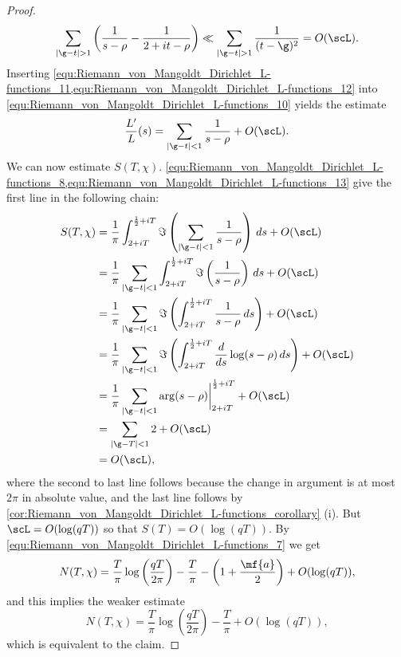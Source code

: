 \begin{proof}
\begin{equation}
          \sum_{|\g-t| > 1}\left(\frac{1}{s-\rho}-\frac{1}{2+it-\rho}\right) \ll \sum_{|\g-t| > 1}\frac{1}{(t-\g)^{2}} = O(\scL).
        \end{equation}
        Inserting \cref{equ:Riemann_von_Mangoldt_Dirichlet_L-functions_11,equ:Riemann_von_Mangoldt_Dirichlet_L-functions_12} into \cref{equ:Riemann_von_Mangoldt_Dirichlet_L-functions_10} yields the estimate
        \begin{equation}\label{equ:Riemann_von_Mangoldt_Dirichlet_L-functions_13}
          \frac{L'}{L}(s) = \sum_{|\g-t| < 1}\frac{1}{s-\rho}+O(\scL).
        \end{equation}
        We can now estimate $S(T,\chi)$. \cref{equ:Riemann_von_Mangoldt_Dirichlet_L-functions_8,equ:Riemann_von_Mangoldt_Dirichlet_L-functions_13} give the first line in the following chain:
        \begin{align*}
          S(T,\chi) &= \frac{1}{\pi}\int_{2+iT}^{\frac{1}{2}+iT}\Im\left(\sum_{|\g-t| < 1}\frac{1}{s-\rho}\right)\,ds+O(\scL) \\
          &= \frac{1}{\pi}\sum_{|\g-t| < 1}\int_{2+iT}^{\frac{1}{2}+iT}\Im\left(\frac{1}{s-\rho}\right)\,ds+O(\scL) \\
          &= \frac{1}{\pi}\sum_{|\g-t| < 1}\Im\left(\int_{2+iT}^{\frac{1}{2}+iT}\frac{1}{s-\rho}\,ds\right)+O(\scL) \\
          &= \frac{1}{\pi}\sum_{|\g-t| < 1}\Im\left(\int_{2+iT}^{\frac{1}{2}+iT}\frac{d}{ds}\log(s-\rho)\,ds\right)+O(\scL) \\
          &= \frac{1}{\pi}\sum_{|\g-t| < 1}\arg(s-\rho)\bigg|_{2+iT}^{\frac{1}{2}+iT}+O(\scL) \\
          &= \sum_{|\g-T| < 1}2+O(\scL) \\
          &= O(\scL),
        \end{align*}
        where the second to last line follows because the change in argument is at most $2\pi$ in absolute value, and the last line follows by \cref{cor:Riemann_von_Mangoldt_Dirichlet_L-functions_corollary} (i). But $\scL = O(\log(qT))$ so that $S(T) = O(\log(qT))$. By \cref{equ:Riemann_von_Mangoldt_Dirichlet_L-functions_7} we get
        \[
          N(T,\chi) = \frac{T}{\pi}\log\left(\frac{qT}{2\pi}\right)-\frac{T}{\pi}-\left(1+\frac{\mf{a}}{2}\right)+O(\log(qT)),
        \]
        and this implies the weaker estimate
        \[
          N(T,\chi) = \frac{T}{\pi}\log\left(\frac{qT}{2\pi}\right)-\frac{T}{\pi}+O(\log(qT)),
        \]
        which is equivalent to the claim.
      \end{proof}

